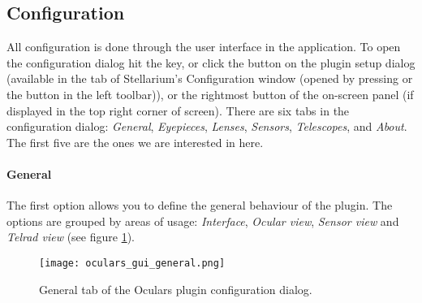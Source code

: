 \subsection{Configuration}
\label{sec:sec:plugins:Oculars:Configuration}
All configuration is done through the user interface in the application. 
To open the configuration dialog hit the  key, 
or click the  button on the plugin setup dialog (available in the
 tab of Stellarium's Configuration window (opened by 
pressing  or the  button in the left toolbar)), 
or the rightmost button of the on-screen panel (if displayed in the top right corner of screen). 
There are six tabs in the configuration dialog: \emph{General}, \emph{Eyepieces}, \emph{Lenses}, \emph{Sensors}, \emph{Telescopes}, and \emph{About}. The first five are the ones we are interested in here.

\paragraph{General}

The first option allows you to define the general behaviour of the plugin. 
The options are grouped by areas of usage: \emph{Interface}, \emph{Ocular view}, \emph{Sensor view} and \emph{Telrad view} (see figure \ref{fig:plugins:Oculars:Gui:General}).

\begin{figure}[ht]\centering
  \texttt{[image: oculars\_gui\_general.png]}
\caption{General tab of the Oculars plugin configuration dialog.}
\label{fig:plugins:Oculars:Gui:General}
\end{figure}

